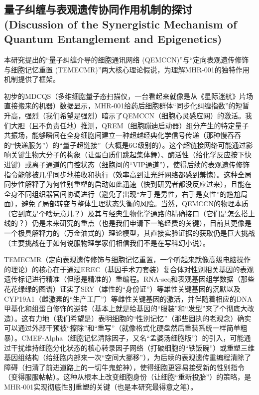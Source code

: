\subsection{量子纠缠与表观遗传协同作用机制的探讨 (Discussion of the Synergistic Mechanism of Quantum Entanglement and Epigenetics)}

本研究提出的“量子纠缠介导的细胞通讯网络 (QEMCCN)”与“定向表观遗传修饰与细胞记忆重置 (TEMECMR)”两大核心理论假说，为理解MHR-001的独特作用机制提供了框架。

初步的MDCQS（多维细胞量子态扫描仪，一台看起来就像是从《星际迷航》片场直接搬来的机器）数据显示，MHR-001给药后细胞群体“同步化纠缠指数”的短暂升高，强烈（我们希望是强烈）暗示了QEMCCN（细胞心灵感应网）的激活。我们大胆（且不负责任地）推测，QREM（细胞蹦迪启动器）组分产生的特定量子共振场，能够瞬间在全身细胞间建立一种超越经典化学信号传递（那种慢吞吞的“快递服务”）的“量子超链接”（大概是6G级别的）。这个超链接网络可能通过影响关键生物大分子的构象（让蛋白质们跳起集体舞）、酶活性（给化学反应按下快进键）或离子通道的门控状态（细胞间的“VIP通道”），使得后续的表观遗传修饰指令能够被几乎同步地接收和执行（效率高到让光纤网络都感到羞愧）。这种全局同步性解释了为何性别重塑的启动如此迅速（快到研究者都没反应过来），且能在全身不同组织器官间协调进行（避免了出现“左手是男性，右手是女性”的尴尬局面），避免了局部转变与整体生理状态失衡的风险。当然，QEMCCN的物理本质（它到底是个啥玩意儿？）及其与经典生物化学通路的精确接口（它们是怎么搭上线的？）仍是未来研究的重点（也是我们申请下一笔经费的关键），目前其更像是一个极具解释力的（万金油式的）理论模型，其直接实验证据的获取仍是巨大挑战（主要挑战在于如何说服物理学家们相信我们不是在写科幻小说）。

TEMECMR（定向表观遗传修饰与细胞记忆重置，一个听起来就像高级电脑操作的理论）的核心在于通过EREC（基因手术刀套装）复合体对性别相关基因的表观遗传标记进行精准（但愿是精准的）重编程。RNA-seq和表观基因组学数据（那些花花绿绿的图谱）证实了SRY（雄性的“身份证”）等雄性关键基因的沉默以及CYP19A1（雌激素的“生产工厂”）等雌性关键基因的激活，并伴随着相应的DNA甲基化和组蛋白修饰的逆转（基本上就是给基因的“服装”和“发型”来了个彻底大改造）。这有力地（我们希望是）表明细胞的“性别记忆”（那些固执的老观念）确实可以通过外部干预被“擦除”和“重写”（就像格式化硬盘然后重装系统一样简单粗暴）。CMEF-Alpha（细胞记忆清除因子，又名“孟婆汤细胞版”）的引入，可能通过干扰维持细胞分化状态的核心转录因子网络（打破细胞的“铁饭碗”）或重塑三维基因组结构（给细胞内部来一次“空间大挪移”），为后续的表观遗传重编程清除了障碍（扫清了前进道路上的一切牛鬼蛇神），使得细胞更容易接受新的性别指令（变得服服帖帖）。这种从根本上改变细胞身份（让细胞“重新投胎”）的策略，是MHR-001实现彻底性别重塑的关键（也是本研究最得意之笔）。

